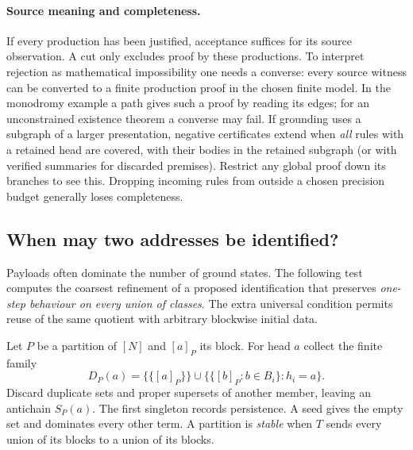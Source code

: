 \paragraph{Source meaning and completeness.}
If every production has been justified, acceptance suffices for its source observation. A cut only excludes proof by these productions. To interpret rejection as mathematical impossibility one needs a converse: every source witness can be converted to a finite production proof in the chosen finite model. In the monodromy example a path gives such a proof by reading its edges; for an unconstrained existence theorem a converse may fail. If grounding uses a subgraph of a larger presentation, negative certificates extend when \emph{all} rules with a retained head are covered, with their bodies in the retained subgraph (or with verified summaries for discarded premises). Restrict any global proof down its branches to see this. Dropping incoming rules from outside a chosen precision budget generally loses completeness.

\subsection{When may two addresses be identified?}\label{sec:quotient}
Payloads often dominate the number of ground states. The following test computes the coarsest refinement of a proposed identification that preserves \emph{one-step behaviour on every union of classes}. The extra universal condition permits reuse of the same quotient with arbitrary blockwise initial data.

Let $P$ be a partition of $[N]$ and $[a]_P$ its block. For head $a$ collect the finite family
\[
 D_P(a)=\{\{[a]_P\}\}\cup
   \bigl\{\{[b]_P:b\in B_i\}: h_i=a\bigr\}.
\]
Discard duplicate sets and proper supersets of another member, leaving an antichain $S_P(a)$. The first singleton records persistence. A seed gives the empty set and dominates every other term. A partition is \emph{stable} when $T$ sends every union of its blocks to a union of its blocks.

